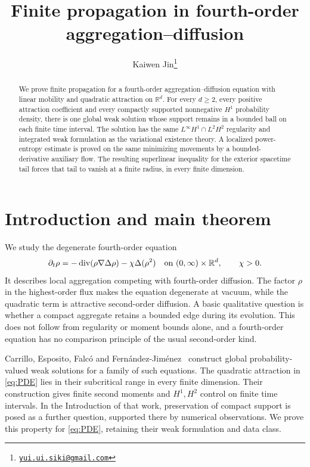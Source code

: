 \documentclass[11pt]{article}
\title{Finite propagation in fourth-order aggregation--diffusion}
\author{Kaiwen Jin\thanks{\href{mailto:yui.ui.siki@gmail.com}{\texttt{yui.ui.siki@gmail.com}}}}
\date{}
\numberwithin{equation}{section}
\theoremstyle{definition}
\theoremstyle{remark}
\newcommand{\R}{\mathbb R}
\newcommand{\Div}{\operatorname{div}}
\begin{document}
\maketitle
\begin{abstract}
We prove finite propagation for a fourth-order aggregation--diffusion equation
with linear mobility and quadratic attraction on $\R^d$.
For every $d\ge2$, every positive attraction coefficient and every compactly
supported nonnegative $H^1$ probability density, there is one global weak
solution whose support remains in a bounded ball on each finite time interval.
The solution has the same $L^\infty H^1\cap L^2H^2$ regularity and integrated
weak formulation as the variational existence theory.
A localized power-entropy estimate is proved on the same minimizing
movements by a bounded-derivative auxiliary flow. The resulting superlinear
inequality for the exterior spacetime tail forces that tail to vanish at a
finite radius, in every finite dimension.
\end{abstract}

\section{Introduction and main theorem}\label{sec:introduction}
We study the degenerate fourth-order equation
\begin{equation}\label{eq:PDE}
 \partial_t\rho=-\Div(\rho\nabla\Delta\rho)-\chi\Delta(\rho^2)
       \quad\hbox{on }(0,\infty)\times\R^d,\qquad \chi>0.
\end{equation}
It describes local aggregation competing with fourth-order diffusion.
The factor $\rho$ in the highest-order flux makes the equation degenerate
at vacuum, while the quadratic term is attractive second-order diffusion.
A basic qualitative question is whether a compact aggregate retains a
bounded edge during its evolution. This does not follow from regularity or
moment bounds alone, and a fourth-order equation has no comparison principle
of the usual second-order kind.

Carrillo, Esposito, Falc\'o and Fern\'andez-Jim\'enez~\cite{CEFF} construct
global probability-valued weak solutions for a family of such equations.
The quadratic attraction in \eqref{eq:PDE} lies in their subcritical range
in every finite dimension. Their construction gives finite second moments
and $H^1,H^2$ control on finite time intervals. In the Introduction of that
work, preservation of compact support is posed as a further question,
supported there by numerical observations. We prove this property for
\eqref{eq:PDE}, retaining their weak formulation and data class.
\end{document}
